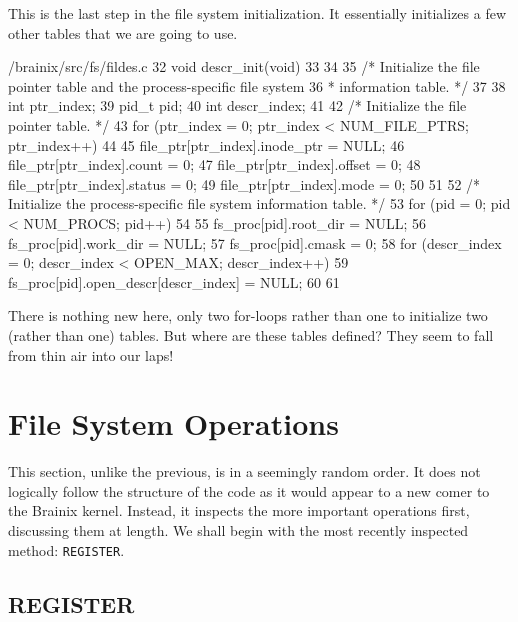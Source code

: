 This is the last step in the file system initialization. It essentially initializes a few other tables that we are going to use.
\begin{code}{/brainix/src/fs/fildes.c}
32 void descr_init(void)
33 {
34 
35 /* Initialize the file pointer table and the process-specific file system
36  * information table. */
37 
38      int ptr_index;
39      pid_t pid;
40      int descr_index;
41 
42      /* Initialize the file pointer table. */
43      for (ptr_index = 0; ptr_index < NUM_FILE_PTRS; ptr_index++)
44      {
45           file_ptr[ptr_index].inode_ptr = NULL;
46           file_ptr[ptr_index].count = 0;
47           file_ptr[ptr_index].offset = 0;
48           file_ptr[ptr_index].status = 0;
49           file_ptr[ptr_index].mode = 0;
50      }
51 
52      /* Initialize the process-specific file system information table. */
53      for (pid = 0; pid < NUM_PROCS; pid++)
54      {
55           fs_proc[pid].root_dir = NULL;
56           fs_proc[pid].work_dir = NULL;
57           fs_proc[pid].cmask = 0;
58           for (descr_index = 0; descr_index < OPEN_MAX; descr_index++)
59                fs_proc[pid].open_descr[descr_index] = NULL;
60      }
61 }
\end{code}
There is nothing new here, only two for-loops rather than one to initialize two (rather than one) tables. But where are these tables defined? They seem to fall from thin air into our laps!


 

\section{File System Operations}

This section, unlike the previous, is in a seemingly random order. It does not logically follow the structure of the code as it would appear to a new comer to the Brainix kernel. Instead, it inspects the more important operations first, discussing them at length. We shall begin with the most recently inspected method: \verb|REGISTER|.

\subsection{REGISTER}

